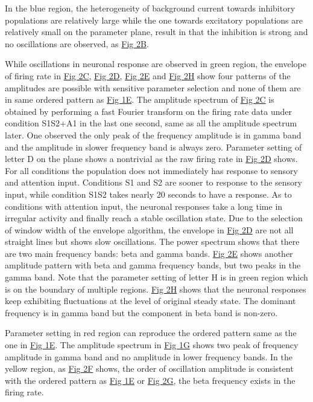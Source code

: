 \documentclass[10pt,letterpaper]{article}
\begin{document}
In the blue region, the heterogeneity of background current towards inhibitory populations are relatively large while the one towards excitatory populations are relatively small on the parameter plane, result in that the inhibition is strong and no oscillations are observed, as \hyperlink{fig:fig2}{Fig 2B}. 

While oscillations in neuronal response are observed in green region, the envelope of firing rate in \hyperlink{fig:fig2}{Fig 2C}, \hyperlink{fig:fig2}{Fig 2D}, \hyperlink{fig:fig2}{Fig 2E} and \hyperlink{fig:fig2}{Fig 2H} show four patterns of the amplitudes are possible with sensitive parameter selection and none of them are in same ordered pattern as \hyperlink{fig:fig1}{Fig 1E}.
The amplitude spectrum of \hyperlink{fig:fig1}{Fig 2C} is obtained by performing a fast Fourier transform on the firing rate data under condition S1S2+A1 in the last one second, same as all the amplitude spectrum later. One observed the only peak of the frequency amplitude is in gamma band and the amplitude in slower frequency band is always zero. Parameter setting of letter D on the plane shows a nontrivial as the raw firing rate in \hyperlink{fig:fig2}{Fig 2D} shows. For all conditions the population does not immediately has response to sensory and attention input. Conditions S1 and S2 are sooner to response to the sensory input, while condition S1S2 takes nearly 20 seconds to have a response. As to conditions with attention input, the neuronal responses take a long time in irregular activity and finally reach a stable oscillation state. Due to the selection of window width of the envelope algorithm, the envelope in \hyperlink{fig:fig2}{Fig 2D} are not all straight lines but shows slow oscillations. The power spectrum shows that there are two main frequency bands: beta and gamma bands. \hyperlink{fig: fig2}{Fig 2E} shows another amplitude pattern with beta and gamma frequency bands, but two peaks in the gamma band. Note that the parameter setting of letter H is in green region which is on the boundary of multiple regions. \hyperlink{fig:fig2}{Fig 2H} shows that the neuronal responses keep exhibiting fluctuations at the level of original steady state. The dominant frequency is in gamma band but the component in beta band is non-zero. 

Parameter setting in red region can reproduce the ordered pattern same as the one in \hyperlink{fig:fig1}{Fig 1E}. The amplitude spectrum in \hyperlink{fig:fig2}{Fig 1G} shows two peak of frequency amplitude in gamma band and no amplitude in lower frequency bands.
In the yellow region, as \hyperlink{fig:fig2}{Fig 2F} shows, the order of oscillation amplitude is consistent with the ordered pattern as \hyperlink{fig:fig1}{Fig 1E} or \hyperlink{fig:fig2}{Fig 2G}, the beta frequency exists in the firing rate.
\end{document}
